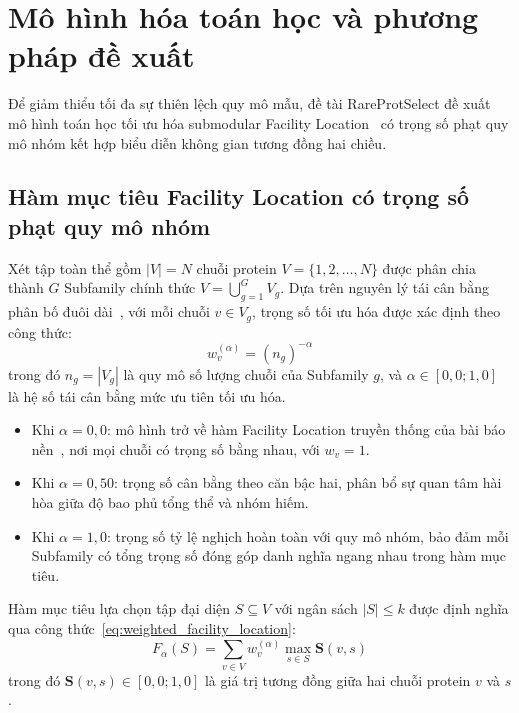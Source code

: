 \section{Mô hình hóa toán học và phương pháp đề xuất}
\label{sec:phuong_phap_mo_hinh_hoa}

Để giảm thiểu tối đa sự thiên lệch quy mô mẫu, đề tài RareProtSelect đề xuất mô hình toán học tối ưu hóa submodular Facility Location~\cite{wei2015} có trọng số phạt quy mô nhóm kết hợp biểu diễn không gian tương đồng hai chiều.

\subsection{Hàm mục tiêu Facility Location có trọng số phạt quy mô nhóm}
Xét tập toàn thể gồm $|V| = N$ chuỗi protein $V = \{1, 2, \dots, N\}$ được phân chia thành $G$ Subfamily chính thức $V = \bigcup_{g=1}^G V_g$. Dựa trên nguyên lý tái cân bằng phân bố đuôi dài~\cite{cui2019}, với mỗi chuỗi $v \in V_g$, trọng số tối ưu hóa được xác định theo công thức:
\begin{equation}
    w_v^{(\alpha)} = (n_g)^{-\alpha}
    \label{eq:sample_weight}
\end{equation}
trong đó $n_g = |V_g|$ là quy mô số lượng chuỗi của Subfamily $g$, và $\alpha \in [0{,}0; 1{,}0]$ là hệ số tái cân bằng mức ưu tiên tối ưu hóa.
\begin{itemize}[noitemsep,topsep=2pt]
    \item Khi $\alpha = 0{,}0$: mô hình trở về hàm Facility Location truyền thống của bài báo nền~\cite{nguyen2025}, nơi mọi chuỗi có trọng số bằng nhau, với $w_v = 1$.
    \item Khi $\alpha = 0{,}50$: trọng số cân bằng theo căn bậc hai, phân bổ sự quan tâm hài hòa giữa độ bao phủ tổng thể và nhóm hiếm.
    \item Khi $\alpha = 1{,}0$: trọng số tỷ lệ nghịch hoàn toàn với quy mô nhóm, bảo đảm mỗi Subfamily có tổng trọng số đóng góp danh nghĩa ngang nhau trong hàm mục tiêu.
\end{itemize}

Hàm mục tiêu lựa chọn tập đại diện $S \subseteq V$ với ngân sách $|S| \le k$ được định nghĩa qua công thức~\eqref{eq:weighted_facility_location}:
\begin{equation}
    F_\alpha(S) = \sum_{v \in V} w_v^{(\alpha)} \max_{s \in S} \mathbf{S}(v, s)
    \label{eq:weighted_facility_location}
\end{equation}
trong đó $\mathbf{S}(v, s) \in [0{,}0; 1{,}0]$ là giá trị tương đồng giữa hai chuỗi protein $v$ và $s$.

